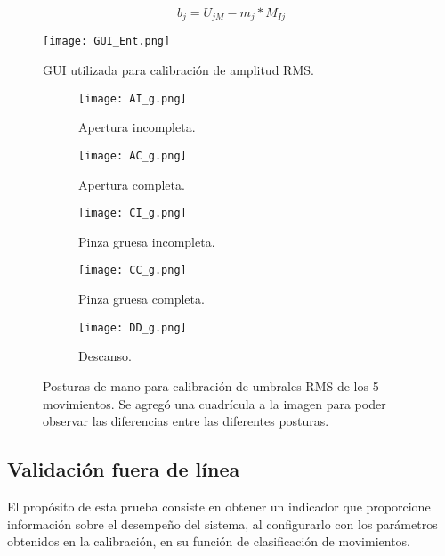 \vfill
\begin{equation}
	b_{j} = U_{jM} - m_{j}*M_{Ij}
	\label{Ecu: b}
\end{equation}

\vfill
\begin{figure}[htb]
	\centering
	\texttt{[image: GUI\_Ent.png]}
	\caption{GUI utilizada para calibración de amplitud RMS.}
	\label{Figura: GUI_Ent}
\end{figure}

\begin{figure}[htbp]
	\centering
	\begin{subfigure}[htbp]{0.4\textwidth}
		\texttt{[image: AI\_g.png]}
		\caption{Apertura incompleta.}
		\label{Figura: AI}
	\end{subfigure}
	\begin{subfigure}[htbp]{0.4\textwidth}
		\texttt{[image: AC\_g.png]}
		\caption{Apertura completa.}
		\label{Figura: AC}
	\end{subfigure}
	\newline
	\begin{subfigure}[htbp]{0.4\textwidth}
		\texttt{[image: CI\_g.png]}
		\caption{Pinza gruesa incompleta.}
		\label{Figura: CI}
	\end{subfigure}
	\begin{subfigure}[htbp]{0.4\textwidth}
		\texttt{[image: CC\_g.png]}
		\caption{Pinza gruesa completa.}
		\label{Figura: CC}
	\end{subfigure}
	\newline
	\begin{subfigure}[htbp]{0.4\textwidth}
		\texttt{[image: DD\_g.png]}
		\caption{Descanso.}
		\label{Figura: DD}
	\end{subfigure}
	\caption[Posturas de mano para calibración de umbrales RMS]{Posturas de mano para calibración de umbrales RMS de los 5 movimientos. Se agregó una cuadrícula a la imagen para poder observar las diferencias entre las diferentes posturas.}
	\label{Figura: Posturas}
\end{figure}

\newpage
\subsection{Validación fuera de línea}
El propósito de esta prueba consiste en obtener un indicador que proporcione información sobre el desempeño del sistema, al configurarlo con los parámetros obtenidos en la calibración, en su función de clasificación de movimientos.

